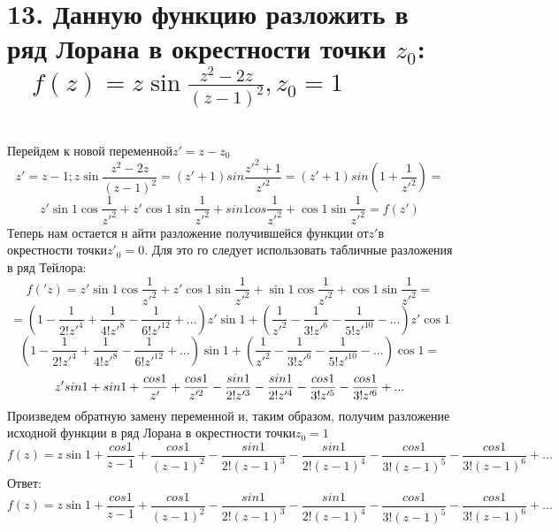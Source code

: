 \documentclass{article}
\begin{document}
	\section{13. Данную функцию разложить в ряд Лорана в окрестности точки $z_{0}$:
	$\quad f(z)=z\sin{\frac{z^{2} -2z}{(z-1)^{2}}}, z_{0} = 1$}
	\\ Перейдем к новой переменной$z' = z-z_0$ $$z' = z-1; z\sin{\frac{z^{2} -2z}{(z-1)^{2}}}
	= (z'+1)sin\frac{z'^{2} + 1}{z'^{2}}= (z'+1)sin\left( 1 + \frac{1}{z'^{ 2}}\right
	) =$$ $$z'\sin{1}\cos{\frac{1}{z'^{2}}}+ z'\cos{1}\sin{\frac{1}{z'^{2}}}+ sin1c
	os\frac{1}{z'^{2}}+ \cos{1}\sin{\frac{1}{z'^{2}}}= f(z')$$Теперь нам остается н
	айти разложение получившейся функции от$z'$в окрестности точки$z'_0=0$. Для это
	го следует использовать табличные разложения в ряд Тейлора:$$f('z) = z'\sin{1}\cos
	{\frac{1}{z'^{2}}}+ z'\cos{1}\sin{\frac{1}{z'^{2}}}+ \sin{1}\cos{\frac{1}{z'^{2}}}
	+ \cos{1}\sin{\frac{1}{z'^{2}}}=$$ $$= \left( 1 - \frac{1}{2!z'^{4}}+ \frac{1}{4!z'^{8}}
	- \frac{1}{6!z'^{12}}+ ... \right)z'\sin{1}+ \left( \frac{1}{z'^{2}}- \frac{1}{3!z'^{6}}
	- \frac{1}{5!z'^{10}}- ...\right)z'\cos{1}$$ $$\left( 1 - \frac{1}{2!z'^{4}}+ \frac{1}{4!z'^{8}}
	- \frac{1}{6!z'^{12}}+ ... \right)\sin{1}+ \left( \frac{1}{z'^{2}}- \frac{1}{3!z'^{6}}
	- \frac{1}{5!z'^{10}}- ...\right)\cos{1}=$$ $$z'sin1 + sin1 + \frac{cos1}{z'}+
	\frac{cos1}{z'^{2}}- \frac{sin1}{2!z'^{3}}- \frac{sin1}{2!z'^{4}}- \frac{cos1}{3!z'^{5}}
	- \frac{cos1}{3!z'^{6}}+ ...
	\vspace{0.4cm}$$Произведем обратную замену переменной и, таким образом, получим
	разложение исходной функции в ряд Лорана в окрестности точки$z_0=1$ $$f(z) = z\sin
	{1}+ \frac{cos1}{z-1}+ \frac{cos1}{(z-1)^{2}}- \frac{sin1}{2!(z-1)^{3}}- \frac{sin1}{2!(z-1)^{4}}
	- \frac{cos1}{3!(z-1)^{5}}- \frac{cos1}{3!(z-1)^{6}}+ ...$$Ответ:$$f(z) = z\sin
	{1}+ \frac{cos1}{z-1}+ \frac{cos1}{(z-1)^{2}}- \frac{sin1}{2!(z-1)^{3}}- \frac{sin1}{2!(z-1)^{4}}
	- \frac{cos1}{3!(z-1)^{5}}- \frac{cos1}{3!(z-1)^{6}}+ ...$$%
\end{document}
